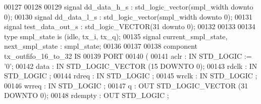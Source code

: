 \begin{DoxyCode}
00127   
00128   
00129     \textcolor{keywordflow}{signal} \textcolor{vhdlchar}{dd_data_h_s}       \textcolor{vhdlchar}{:} \textcolor{comment}{std\_logic\_vector}\textcolor{vhdlchar}{(}\textcolor{vhdlchar}{smpl_width} \textcolor{keywordflow}{downto} \textcolor{vhdllogic}{}\textcolor{vhdllogic}{0}\textcolor{vhdlchar}{)};
00130     \textcolor{keywordflow}{signal} \textcolor{vhdlchar}{dd_data_l_s}       \textcolor{vhdlchar}{:} \textcolor{comment}{std\_logic\_vector}\textcolor{vhdlchar}{(}\textcolor{vhdlchar}{smpl_width} \textcolor{keywordflow}{downto} \textcolor{vhdllogic}{}\textcolor{vhdllogic}{0}\textcolor{vhdlchar}{)};
00131     \textcolor{keywordflow}{signal} \textcolor{vhdlchar}{test_data_out_s}   \textcolor{vhdlchar}{:} \textcolor{comment}{std\_logic\_VECTOR}\textcolor{vhdlchar}{(}\textcolor{vhdllogic}{}\textcolor{vhdllogic}{31} \textcolor{keywordflow}{downto} \textcolor{vhdllogic}{}\textcolor{vhdllogic}{0}\textcolor{vhdlchar}{)};
00132 
00133   
00134   \textcolor{keywordflow}{type} \textcolor{vhdlchar}{smpl_state} \textcolor{keywordflow}{is} \textcolor{vhdlchar}{(}\textcolor{vhdlchar}{idle}\textcolor{vhdlchar}{,} \textcolor{vhdlchar}{tx\_i}\textcolor{vhdlchar}{,} \textcolor{vhdlchar}{tx\_q}\textcolor{vhdlchar}{)};
00135   \textcolor{keywordflow}{signal} \textcolor{vhdlchar}{current_smpl_state}\textcolor{vhdlchar}{,} \textcolor{vhdlchar}{next_smpl_state} \textcolor{vhdlchar}{:}  \textcolor{vhdlchar}{smpl_state}; 
00136 
00137   
00138   \textcolor{keywordflow}{component} tx_outfifo_16_to_32 \textcolor{keywordflow}{IS} 
00139     \textcolor{keywordflow}{PORT}
00140     (
00141         aclr        : \textcolor{keywordflow}{IN} \textcolor{comment}{STD\_LOGIC}  := '\textcolor{vhdllogic}{}\textcolor{vhdllogic}{0}';
00142         data        : \textcolor{keywordflow}{IN} \textcolor{comment}{STD\_LOGIC\_VECTOR} (\textcolor{vhdllogic}{}\textcolor{vhdllogic}{15} \textcolor{keywordflow}{DOWNTO} \textcolor{vhdllogic}{}\textcolor{vhdllogic}{0});
00143         rdclk       : \textcolor{keywordflow}{IN} \textcolor{comment}{STD\_LOGIC} ;
00144         rdreq       : \textcolor{keywordflow}{IN} \textcolor{comment}{STD\_LOGIC} ;
00145         wrclk       : \textcolor{keywordflow}{IN} \textcolor{comment}{STD\_LOGIC} ;
00146         wrreq       : \textcolor{keywordflow}{IN} \textcolor{comment}{STD\_LOGIC} ;
00147         q           : \textcolor{keywordflow}{OUT} \textcolor{comment}{STD\_LOGIC\_VECTOR} (\textcolor{vhdllogic}{}\textcolor{vhdllogic}{31} \textcolor{keywordflow}{DOWNTO} \textcolor{vhdllogic}{}\textcolor{vhdllogic}{0});
00148         rdempty : \textcolor{keywordflow}{OUT} \textcolor{comment}{STD\_LOGIC} ;

\end{DoxyCode}
